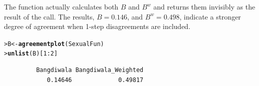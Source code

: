 \documentclass[10pt,krantz2]{krantz}\usepackage[]{graphicx}\usepackage[]{color}
\makeatletter
\newcommand{\hlnum}[1]{\textcolor[rgb]{0.686,0.059,0.569}{#1}}%
\newcommand{\hlopt}[1]{\textcolor[rgb]{0,0,0}{#1}}%
\newcommand{\hlstd}[1]{\textcolor[rgb]{0.345,0.345,0.345}{#1}}%
\newcommand{\hlkwb}[1]{\textcolor[rgb]{0.69,0.353,0.396}{#1}}%
\newcommand{\hlkwd}[1]{\textcolor[rgb]{0.737,0.353,0.396}{\textbf{#1}}}%
\newenvironment{kframe}{%
 \def\at@end@of@kframe{}%
 \ifinner\ifhmode%
  \def\at@end@of@kframe{\end{minipage}}%
  \begin{minipage}{\columnwidth}%
 \fi\fi%
 \def\FrameCommand##1{\hskip\@totalleftmargin \hskip-\fboxsep
 \colorbox{shadecolor}{##1}\hskip-\fboxsep
     \hskip-\linewidth \hskip-\@totalleftmargin \hskip\columnwidth}%
 \MakeFramed {\advance\hsize-\width
   \@totalleftmargin\z@ \linewidth\hsize
   \@setminipage}}%
 {\par\unskip\endMakeFramed%
 \at@end@of@kframe}
\newenvironment{knitrout}{}{} %
\renewenvironment{knitrout}{\small\renewcommand{\baselinestretch}{.85}}{} %
\makeatother
\begin{document}
The function  actually calculates both $B$ and $B^w$
and returns them invisibly as the result of the call.
The results, $B = 0.146$, and $B^w = 0.498$, indicate a stronger
degree of agreement when 1-step disagreements are included.
\begin{knitrout}
\color{fgcolor}\begin{kframe}
\begin{alltt}
\hlstd{> }\hlstd{B} \hlkwb{<-} \hlkwd{agreementplot}\hlstd{(SexualFun)}
\hlstd{> }\hlkwd{unlist}\hlstd{(B)[}\hlnum{1} \hlopt{:} \hlnum{2}\hlstd{]}
\end{alltt}
\begin{verbatim}
         Bangdiwala Bangdiwala_Weighted 
            0.14646             0.49817 
\end{verbatim}
\end{kframe}
\end{knitrout}
\end{document}
